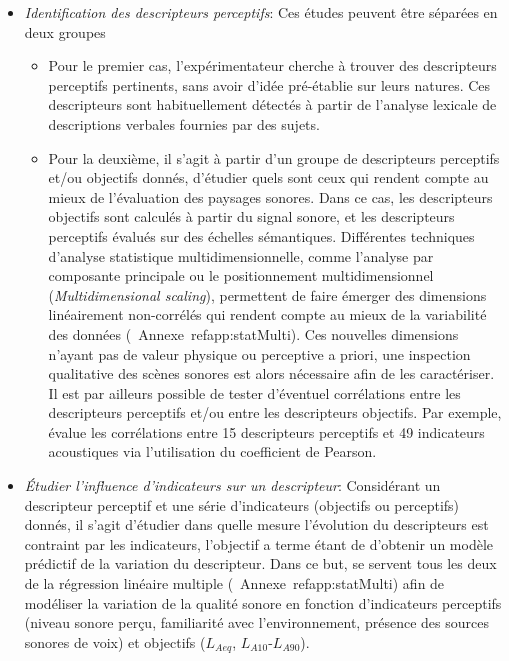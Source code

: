 \begin{itemize}

\item \emph{Identification des descripteurs perceptifs}: Ces études peuvent être séparées en deux groupes

\begin{itemize}
\item Pour le premier cas, l'expérimentateur cherche à trouver des descripteurs perceptifs pertinents, sans avoir d'idée pré-établie sur leurs natures. Ces descripteurs sont habituellement détectés à partir  de l'analyse lexicale de descriptions verbales fournies par des sujets.
\item Pour la deuxième, il s'agit à partir d'un groupe de descripteurs perceptifs et/ou objectifs donnés, d'étudier quels sont ceux qui rendent compte au mieux de l'évaluation des paysages sonores. Dans ce cas, les descripteurs objectifs sont calculés à partir du signal sonore, et les descripteurs perceptifs évalués sur des échelles sémantiques. Différentes techniques d'analyse statistique multidimensionnelle, comme l'analyse par composante principale ou le positionnement multidimensionnel (\emph{Multidimensional scaling}), permettent de faire émerger des dimensions linéairement non-corrélés qui rendent compte au mieux de la variabilité des données \citep{cain2013development,torija2013application} (\Cf~Annexe~ref{app:statMulti}). Ces nouvelles dimensions n'ayant pas de valeur physique ou perceptive a priori, une inspection qualitative des scènes sonores est alors nécessaire afin de les caractériser. Il est par ailleurs possible de tester d'éventuel corrélations entre les descripteurs perceptifs et/ou entre les descripteurs objectifs. Par exemple, \citep{torija2013application} évalue les corrélations entre 15 descripteurs perceptifs et 49 indicateurs acoustiques via l'utilisation du coefficient de Pearson.
\end{itemize}

\item \emph{Étudier l'influence d'indicateurs sur un descripteur}: Considérant un descripteur perceptif et une série d'indicateurs (objectifs ou perceptifs) donnés, il s'agit d'étudier dans quelle mesure l'évolution du descripteurs est contraint par les indicateurs, l'objectif a terme étant de d'obtenir un modèle prédictif de la variation du descripteur. Dans ce but, \citep{lavandier2006contribution,ricciardi2015sound} se servent tous les deux de la régression linéaire multiple (\Cf~Annexe~ref{app:statMulti}) afin de modéliser la variation de la qualité sonore en fonction d'indicateurs perceptifs (niveau sonore perçu, familiarité avec l'environnement, présence des sources sonores de voix) et objectifs ($L_{Aeq}$, $L_{A10}$-$L_{A90}$).


\end{itemize}
